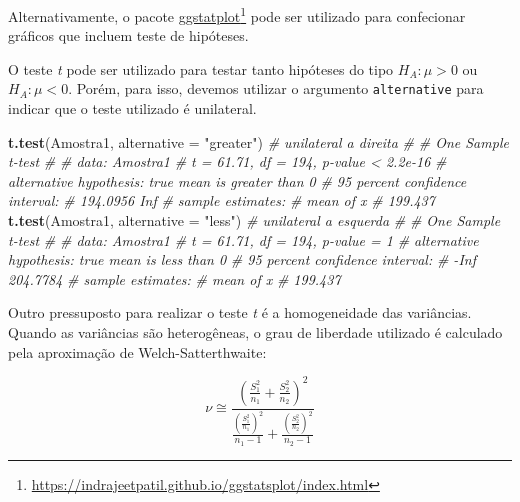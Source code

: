 \documentclass[
]{book}
\newenvironment{Shaded}{\begin{snugshade}}{\end{snugshade}}
\newcommand{\CommentTok}[1]{\textcolor[rgb]{0.56,0.35,0.01}{\textit{#1}}}
\newcommand{\DataTypeTok}[1]{\textcolor[rgb]{0.13,0.29,0.53}{#1}}
\newcommand{\KeywordTok}[1]{\textcolor[rgb]{0.13,0.29,0.53}{\textbf{#1}}}
\newcommand{\NormalTok}[1]{#1}
\newcommand{\StringTok}[1]{\textcolor[rgb]{0.31,0.60,0.02}{#1}}
\begin{document}
Alternativamente, o pacote \href{https://indrajeetpatil.github.io/ggstatsplot/index.html}{ggstatplot}\footnote{\url{https://indrajeetpatil.github.io/ggstatsplot/index.html}} pode ser utilizado para confecionar gráficos que incluem teste de hipóteses.

O teste \emph{t} pode ser utilizado para testar tanto hipóteses do tipo \({H_A}:\mu > 0\) ou \({H_A}:\mu < 0\). Porém, para isso, devemos utilizar o argumento \texttt{alternative} para indicar que o teste utilizado é unilateral.

\begin{Shaded}
\begin{Highlighting}[]
\KeywordTok{t.test}\NormalTok{(Amostra1, }\DataTypeTok{alternative =} \StringTok{"greater"}\NormalTok{) }\CommentTok{# unilateral a direita}
\CommentTok{# }
\CommentTok{# 	One Sample t-test}
\CommentTok{# }
\CommentTok{# data:  Amostra1}
\CommentTok{# t = 61.71, df = 194, p-value < 2.2e-16}
\CommentTok{# alternative hypothesis: true mean is greater than 0}
\CommentTok{# 95 percent confidence interval:}
\CommentTok{#  194.0956      Inf}
\CommentTok{# sample estimates:}
\CommentTok{# mean of x }
\CommentTok{#   199.437}
\KeywordTok{t.test}\NormalTok{(Amostra1, }\DataTypeTok{alternative =} \StringTok{"less"}\NormalTok{) }\CommentTok{# unilateral a esquerda}
\CommentTok{# }
\CommentTok{# 	One Sample t-test}
\CommentTok{# }
\CommentTok{# data:  Amostra1}
\CommentTok{# t = 61.71, df = 194, p-value = 1}
\CommentTok{# alternative hypothesis: true mean is less than 0}
\CommentTok{# 95 percent confidence interval:}
\CommentTok{#      -Inf 204.7784}
\CommentTok{# sample estimates:}
\CommentTok{# mean of x }
\CommentTok{#   199.437}
\end{Highlighting}
\end{Shaded}


Outro pressuposto para realizar o teste \emph{t} é a homogeneidade das variâncias. Quando as variâncias são heterogêneas, o grau de liberdade utilizado é calculado pela aproximação de Welch-Satterthwaite: 

\[
\nu  \cong \frac{{{{\left( {\frac{{S_1^2}}{{{n_1}}} + \frac{{S_2^2}}{{{n_2}}}} \right)}^2}}}{{\frac{{{{\left( {\frac{{S_1^2}}{{{n_1}}}} \right)}^2}}}{{{n_1} - 1}} + \frac{{{{\left( {\frac{{S_2^2}}{{{n_2}}}} \right)}^2}}}{{{n_2} - 1}}}}
\]

\end{document}
